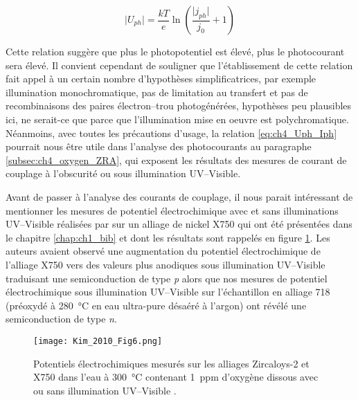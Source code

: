 \begin{refsection}
    \begin{equation}
        \vert U_{ph} \vert = \frac{kT}{e} \ln \left( \frac{\vert j_{ph}\vert}{j_0} + 1 \right)
        \label{eq:ch4_Uph_Iph}
    \end{equation}

    Cette relation suggère que plus le photopotentiel est élevé, plus le photocourant sera élevé. Il convient cependant de
    souligner que l’établissement de cette relation fait appel à un certain nombre d’hypothèses simplificatrices, par
    exemple illumination monochromatique, pas de limitation au transfert et pas de recombinaisons des paires électron--trou
    photogénérées, hypothèses peu plausibles ici, ne serait-ce que parce que l’illumination mise en oeuvre est
    polychromatique. Néanmoins, avec toutes les précautions d’usage, la relation \ref{eq:ch4_Uph_Iph} pourrait nous être utile dans l’analyse
    des photocourants au paragraphe \ref{subsec:ch4_oxygen_ZRA}, qui exposent les résultats des mesures de courant de couplage à l’obscurité ou
    sous illumination UV--Visible.

    Avant de passer à l’analyse des courants de couplage, il nous parait intéressant de mentionner les mesures de
    potentiel électrochimique avec et sans illuminations UV--Visible réalisées par \citet{Kim2010} sur un alliage de
    nickel X750 qui ont été présentées dans le chapitre \ref{chap:ch1_bib} et dont les résultats sont rappelés en figure
    \ref{fig:ch4_Kim_results}. Les
    auteurs avaient observé une augmentation du potentiel électrochimique de l’alliage X750 vers des valeurs plus
    anodiques sous illumination UV--Visible traduisant une semiconduction de type \emph{p} alors que nos mesures de potentiel
    électrochimique sous illumination UV--Visible sur l’échantillon en alliage 718 (préoxydé à \SI{280}{\degreeCelsius} en eau ultra-pure
    désaéré à l’argon) ont révélé une semiconduction de type \emph{n}.

    \begin{figure}[H]
        \centering
        \texttt{[image: Kim\_2010\_Fig6.png]}
        \caption[Potentiels électrochimiques mesurés sur les alliages Zircaloys-2 et X750 dans l’eau à \SI{300}{\degreeCelsius} contenant
        1~ppm d’oxygène dissous avec ou sans illumination UV--Visible.]
        {Potentiels électrochimiques mesurés sur les alliages Zircaloys-2 et X750 dans l’eau à \SI{300}{\degreeCelsius} contenant
        1~ppm d’oxygène dissous avec ou sans illumination UV--Visible \citep{Kim2010}.}
        \label{fig:ch4_Kim_results}
    \end{figure}



\end{refsection}
